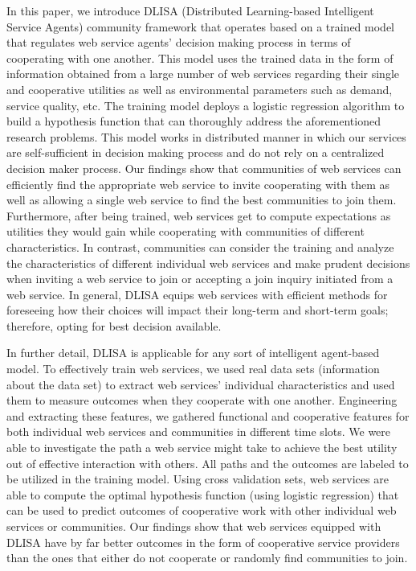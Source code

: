 \documentclass[10pt,journal,cspaper,compsoc]{IEEEtran}
\begin{document}
In this paper, we introduce DLISA (Distributed Learning-based Intelligent Service Agents) community framework that operates based on a trained model that regulates web service agents' decision making process in terms of cooperating with one another. This model uses the trained data in the form of information obtained from a large number of web services regarding their single and cooperative utilities as well as environmental parameters such as demand, service quality, etc. The training model deploys a logistic regression algorithm to build a hypothesis function that can thoroughly address the aforementioned research problems. This model works in distributed manner in which our services are self-sufficient in decision making process and do not rely on a centralized decision maker process. Our findings show that communities of web services can efficiently find the appropriate web service to invite cooperating with them as well as allowing a single web service to find the best communities to join them. Furthermore, after being trained, web services get to compute expectations as utilities they would gain while cooperating with communities of different characteristics. In contrast, communities can consider the training and analyze the characteristics of different individual web services and make prudent decisions when inviting a web service to join or accepting a join inquiry initiated from a web service. In general, DLISA equips web services with efficient methods for foreseeing how their choices will impact their long-term and short-term goals; therefore, opting for best decision available. 

In further detail, DLISA is applicable for any sort of intelligent agent-based model. To effectively train web services, we used real data sets (information about the data set) to extract web services' individual characteristics and used them to measure outcomes when they cooperate with one another. Engineering and extracting these features, we gathered functional and cooperative features for both individual web services and communities in different time slots. We were able to investigate the path a web service might take to achieve the best utility out of effective interaction with others. All paths and the outcomes are labeled to be utilized in the training model. Using cross validation sets, web services are able to compute the optimal hypothesis function (using logistic regression) that can be used to predict outcomes of cooperative work with other individual web services or communities. Our findings show that web services equipped with DLISA have by far better outcomes in the form of cooperative service providers than the ones that either do not cooperate or randomly find communities to join. 
\end{document}
